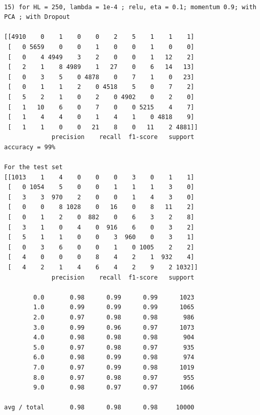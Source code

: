 \documentclass[conference]{IEEEtran}
\begin{document}
 \begin{verbatim}

15) for HL = 250, lambda = 1e-4 ; relu, eta = 0.1; momentum 0.9; with PCA ; with Dropout

[[4910    0    1    0    0    2    5    1    1    1]
 [   0 5659    0    0    1    0    0    1    0    0]
 [   0    4 4949    3    2    0    0    1   12    2]
 [   2    1    8 4989    1   27    0    6   14   13]
 [   0    3    5    0 4878    0    7    1    0   23]
 [   0    1    1    2    0 4518    5    0    7    2]
 [   5    2    1    0    2    0 4902    0    2    0]
 [   1   10    6    0    7    0    0 5215    4    7]
 [   1    4    4    0    1    4    1    0 4818    9]
 [   1    1    0    0   21    8    0   11    2 4881]]
             precision    recall  f1-score   support
accuracy = 99%

For the test set
[[1013    1    4    0    0    0    3    0    1    1]
 [   0 1054    5    0    0    1    1    1    3    0]
 [   3    3  970    2    0    0    1    4    3    0]
 [   0    0    8 1028    0   16    0    8   11    2]
 [   0    1    2    0  882    0    6    3    2    8]
 [   3    1    0    4    0  916    6    0    3    2]
 [   5    1    1    0    0    3  960    0    3    1]
 [   0    3    6    0    0    1    0 1005    2    2]
 [   4    0    0    0    8    4    2    1  932    4]
 [   4    2    1    4    6    4    2    9    2 1032]]
             precision    recall  f1-score   support

        0.0       0.98      0.99      0.99      1023
        1.0       0.99      0.99      0.99      1065
        2.0       0.97      0.98      0.98       986
        3.0       0.99      0.96      0.97      1073
        4.0       0.98      0.98      0.98       904
        5.0       0.97      0.98      0.97       935
        6.0       0.98      0.99      0.98       974
        7.0       0.97      0.99      0.98      1019
        8.0       0.97      0.98      0.97       955
        9.0       0.98      0.97      0.97      1066

avg / total       0.98      0.98      0.98     10000

 \end{verbatim}



  


\end{document}

